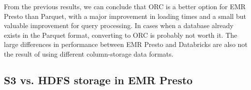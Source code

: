 From the previous results, we can conclude that ORC is a better option for EMR Presto than Parquet, with a major improvement in loading times and a small but valuable improvement for query processing. In cases when a database already exists in the Parquet format, converting to ORC is probably not worth it. The large differences in performance between EMR Presto and Databricks are also not the result of using different column-storage data formats.

\subsection{S3 vs. HDFS storage in EMR Presto}

